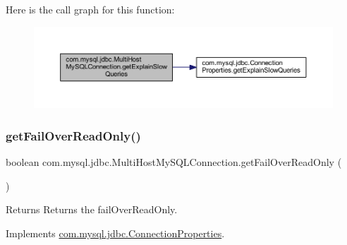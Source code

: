 Here is the call graph for this function\+:
\nopagebreak
\begin{figure}[H]
\begin{center}
\leavevmode
\includegraphics[width=350pt]{classcom_1_1mysql_1_1jdbc_1_1_multi_host_my_s_q_l_connection_a338dacd49865ecaa1edaad1fa98e85a6_cgraph}
\end{center}
\end{figure}
\mbox{\label{classcom_1_1mysql_1_1jdbc_1_1_multi_host_my_s_q_l_connection_a2fdb31070906a426372d786d4f931034}} 
\subsubsection{\texorpdfstring{get\+Fail\+Over\+Read\+Only()}{getFailOverReadOnly()}}
{\footnotesize\ttfamily boolean com.\+mysql.\+jdbc.\+Multi\+Host\+My\+S\+Q\+L\+Connection.\+get\+Fail\+Over\+Read\+Only (\begin{DoxyParamCaption}{ }\end{DoxyParamCaption})}

\begin{DoxyReturn}{Returns}
Returns the fail\+Over\+Read\+Only. 
\end{DoxyReturn}


Implements \mbox{\hyperlink{interfacecom_1_1mysql_1_1jdbc_1_1_connection_properties_a14f395dcf2b5c008aef09513895925f7}{com.\+mysql.\+jdbc.\+Connection\+Properties}}.

